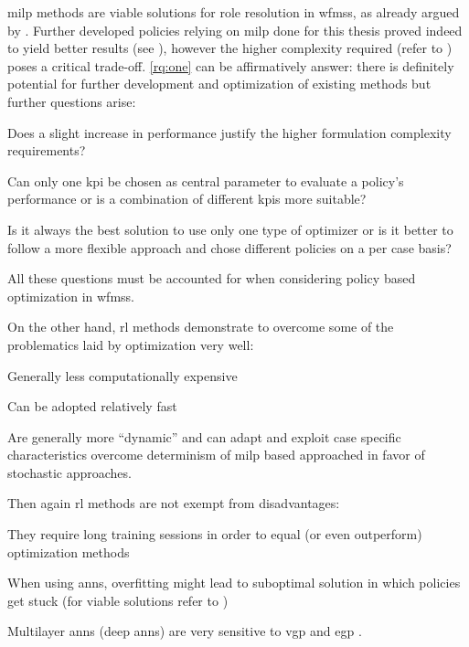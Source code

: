 \gls{milp} methods are viable solutions for role resolution in \glspl{wfms}, as already argued by \citet{Zeng2005}. Further developed policies relying on \gls{milp} done for this thesis proved indeed to yield better results (see ), however the higher complexity required (refer to ) poses a critical trade-off. \ref{rq:one} can be affirmatively answer: there is definitely potential for further development and optimization of existing methods but further questions arise:
\begin{enumerate*}
	\item Does a slight increase in performance justify the higher formulation complexity requirements?
	\item Can only one \gls{kpi} be chosen as central parameter to evaluate a policy's performance or is a combination of different \glspl{kpi} more suitable?
	\item Is it always the best solution to use only one type of optimizer or is it better to follow a more flexible approach and chose different policies on a per case basis?
\end{enumerate*}

All these questions must be accounted for when considering policy based optimization in \glspl{wfms}.

On the other hand, \gls{rl} methods demonstrate to overcome some of the problematics laid by optimization very well:
\begin{enumerate*}
	\item Generally less computationally expensive
	\item Can be adopted relatively fast
	\item Are generally more ``dynamic'' and can adapt and exploit case specific characteristics \ie overcome determinism of \gls{milp} based approached in favor of stochastic approaches.
\end{enumerate*}

Then again \gls{rl} methods are not exempt from disadvantages:
\begin{enumerate*}
	\item They require long training sessions in order to equal (or even outperform) optimization methods
	\item When using \glspl{ann}, overfitting might lead to suboptimal solution in which policies get stuck (for viable solutions refer to \citet{Srivastava2014})
	\item Multilayer \glspl{ann} (\ie deep \glspl{ann}) are very sensitive to \gls{vgp} and \gls{egp} \citep{Bengio1994,Pascanu2012}.
\end{enumerate*}

